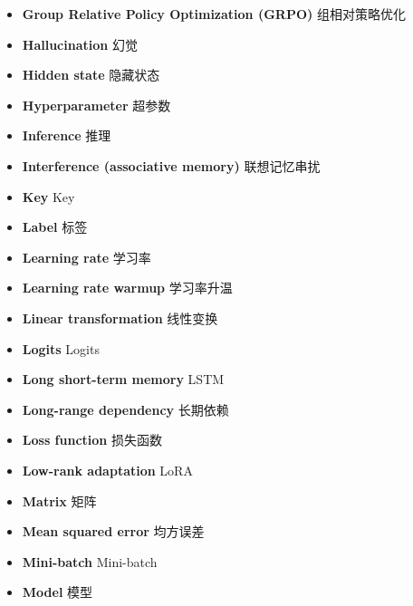 \begin{itemize}[leftmargin=1.2em,itemsep=2pt,topsep=3pt]
\item {\sffamily\bfseries Group Relative Policy Optimization (GRPO)} \quad 组相对策略优化\quad {}
\item {\sffamily\bfseries Hallucination} \quad 幻觉\quad {}
\item {\sffamily\bfseries Hidden state} \quad 隐藏状态\quad {}
\item {\sffamily\bfseries Hyperparameter} \quad 超参数\quad {}
\item {\sffamily\bfseries Inference} \quad 推理\quad {}
\item {\sffamily\bfseries Interference (associative memory)} \quad 联想记忆串扰\quad {}
\item {\sffamily\bfseries Key} \quad Key\quad {}
\item {\sffamily\bfseries Label} \quad 标签\quad {}
\item {\sffamily\bfseries Learning rate} \quad 学习率\quad {}
\item {\sffamily\bfseries Learning rate warmup} \quad 学习率升温\quad {}
\item {\sffamily\bfseries Linear transformation} \quad 线性变换\quad {}
\item {\sffamily\bfseries Logits} \quad Logits\quad {}
\item {\sffamily\bfseries Long short-term memory} \quad LSTM\quad {}
\item {\sffamily\bfseries Long-range dependency} \quad 长期依赖\quad {}
\item {\sffamily\bfseries Loss function} \quad 损失函数\quad {}
\item {\sffamily\bfseries Low-rank adaptation} \quad LoRA\quad {}
\item {\sffamily\bfseries Matrix} \quad 矩阵\quad {}
\item {\sffamily\bfseries Mean squared error} \quad 均方误差\quad {}
\item {\sffamily\bfseries Mini-batch} \quad Mini-batch\quad {}
\item {\sffamily\bfseries Model} \quad 模型\quad {}

\end{itemize}
